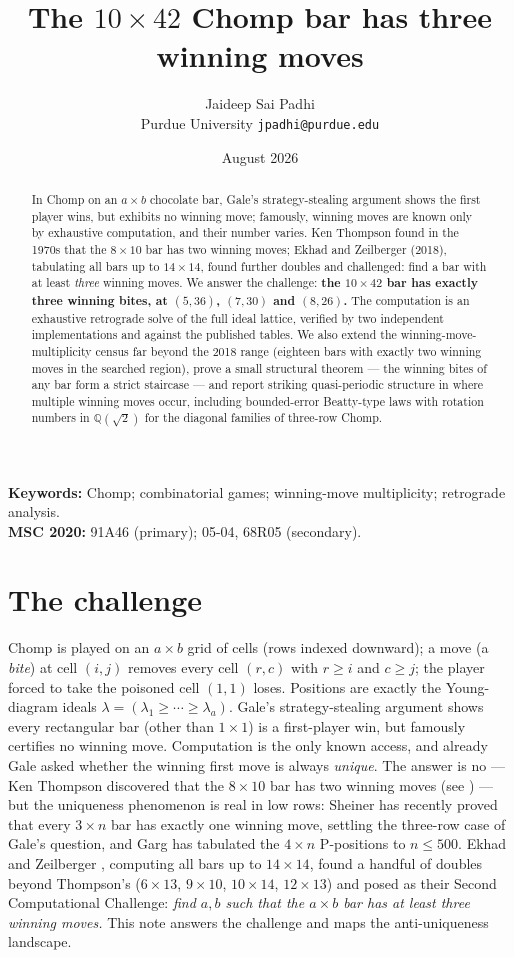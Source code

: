 \documentclass[11pt]{article}
\title{The $10\times42$ Chomp bar has three winning moves}
\author{Jaideep Sai Padhi\\ \small Purdue University \quad \texttt{jpadhi@purdue.edu}}
\date{August 2026}
\begin{document}
\maketitle
\noindent\textbf{Keywords:} Chomp; combinatorial games; winning-move multiplicity; retrograde analysis.\\
\textbf{MSC 2020:} 91A46 (primary); 05-04, 68R05 (secondary).
\begin{abstract}
In Chomp on an $a\times b$ chocolate bar, Gale's strategy-stealing argument shows the first
player wins, but exhibits no winning move; famously, winning moves are known only by exhaustive
computation, and their number varies. Ken Thompson found in the 1970s that the $8\times10$ bar
has two winning moves; Ekhad and Zeilberger (2018), tabulating all bars up to $14\times14$,
found further doubles and challenged: find a bar with at least \emph{three} winning moves. We
answer the challenge: \textbf{the $10\times42$ bar has exactly three winning bites, at
$(5,36)$, $(7,30)$ and $(8,26)$.} The computation is an exhaustive retrograde solve of the
full ideal lattice, verified by two independent implementations and against the published
tables. We also extend the winning-move-multiplicity census far beyond the 2018 range
(eighteen bars with exactly two winning moves in the searched region), prove a small
structural theorem --- the winning bites of any bar form a strict staircase --- and report
striking quasi-periodic structure in where multiple winning moves occur, including
bounded-error Beatty-type laws with rotation numbers in $\mathbb{Q}(\sqrt2)$ for the
diagonal families of three-row Chomp.
\end{abstract}

\section{The challenge}
Chomp is played on an $a\times b$ grid of cells (rows indexed downward); a move (a
\emph{bite}) at cell $(i,j)$ removes every cell $(r,c)$ with $r\ge i$ and $c\ge j$; the
player forced to take the poisoned cell $(1,1)$ loses. Positions are exactly the Young-diagram
ideals $\lambda=(\lambda_1\ge\cdots\ge\lambda_a)$. Gale's strategy-stealing argument
\cite{Gale} shows every rectangular bar (other than $1\times1$) is a first-player win, but
famously certifies no winning move. Computation is the only known access, and already Gale asked whether the winning first
move is always \emph{unique}. The answer is no --- Ken Thompson discovered that the
$8\times10$ bar has two winning moves (see \cite{BHMS}) --- but the uniqueness phenomenon is
real in low rows: Sheiner \cite{Sheiner} has recently proved that every $3\times n$ bar has
exactly one winning move, settling the three-row case of Gale's question, and Garg
\cite{Garg} has tabulated the $4\times n$ P-positions to $n\le500$. Ekhad and Zeilberger
\cite{EZ}, computing all bars up to $14\times14$, found a handful of doubles beyond
Thompson's ($6\times13$, $9\times10$, $10\times14$, $12\times13$) and posed as their Second
Computational Challenge: \emph{find $a,b$ such that the $a\times b$ bar has at least three
winning moves.} This note answers the challenge and maps the anti-uniqueness landscape.
\end{document}
